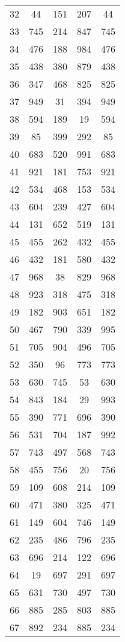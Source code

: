 \documentclass[a4paper,10pt,ngerman]{scrartcl}
\begin{document}
\begin{longtable}[c]{c|c|c|c|c}
    32 & 44 & 151 & 207 & 44 \\
    33 & 745 & 214 & 847 & 745 \\
    34 & 476 & 188 & 984 & 476 \\
    35 & 438 & 380 & 879 & 438 \\
    36 & 347 & 468 & 825 & 825 \\
    37 & 949 & 31 & 394 & 949 \\
    38 & 594 & 189 & 19 & 594 \\
    39 & 85 & 399 & 292 & 85 \\
    40 & 683 & 520 & 991 & 683 \\
    41 & 921 & 181 & 753 & 921 \\
    42 & 534 & 468 & 153 & 534 \\
    43 & 604 & 239 & 427 & 604 \\
    44 & 131 & 652 & 519 & 131 \\
    45 & 455 & 262 & 432 & 455 \\
    46 & 432 & 181 & 580 & 432 \\
    47 & 968 & 38 & 829 & 968 \\
    48 & 923 & 318 & 475 & 318 \\
    49 & 182 & 903 & 651 & 182 \\
    50 & 467 & 790 & 339 & 995 \\
    51 & 705 & 904 & 496 & 705 \\
    52 & 350 & 96 & 773 & 773 \\
    53 & 630 & 745 & 53 & 630 \\
    54 & 843 & 184 & 29 & 993 \\
    55 & 390 & 771 & 696 & 390 \\
    56 & 531 & 704 & 187 & 992 \\
    57 & 743 & 497 & 568 & 743 \\
    58 & 455 & 756 & 20 & 756 \\
    59 & 109 & 608 & 214 & 109 \\
    60 & 471 & 380 & 325 & 471 \\
    61 & 149 & 604 & 746 & 149 \\
    62 & 235 & 486 & 796 & 235 \\
    63 & 696 & 214 & 122 & 696 \\
    64 & 19 & 697 & 291 & 697 \\
    65 & 631 & 730 & 497 & 730 \\
    66 & 885 & 285 & 803 & 885 \\
    67 & 892 & 234 & 885 & 234 \\

\end{longtable}
\end{document}
